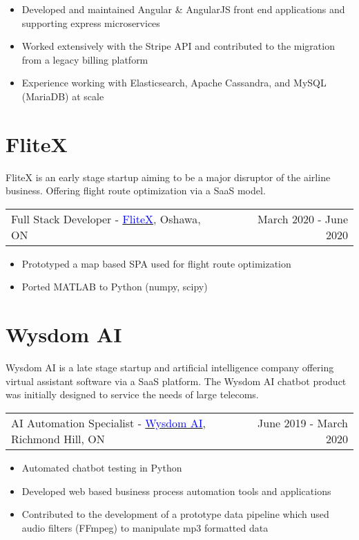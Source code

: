 \documentclass[margin]{res}
\begin{document}
\begin{resume}
	\begin{itemize} %
		\item Developed and maintained Angular \& AngularJS front end applications and supporting
		      express microservices
		\item Worked extensively with the Stripe API and contributed to the migration from a legacy
		      billing platform
		\item Experience working with Elasticsearch, Apache Cassandra, and MySQL (MariaDB) at scale
	\end{itemize}

	\normalsize{\section{FliteX}}

	FliteX is an early stage startup aiming to be a major disruptor of the airline business.
	Offering flight route optimization via a SaaS model.

	\begin{tabular}{p{3in} r} %
		Full Stack Developer - \href{https://flitex.net/}{\textcolor{blue}{FliteX}}, Oshawa, ON & March 2020 - June 2020
	\end{tabular}
	\begin{itemize} %
		\item Prototyped a map based SPA used for flight route optimization
		\item Ported MATLAB to Python (numpy, scipy)
	\end{itemize}

	\normalsize{\section{Wysdom AI}}

	Wysdom AI is a late stage startup and artificial intelligence company offering virtual assistant software
	via a SaaS platform. The Wysdom AI chatbot product was initially designed to service the needs of
	large telecoms.

	\begin{tabular}{p{3in} r} %
		AI Automation Specialist - \href{https://wysdom.ai}{\textcolor{blue}{Wysdom AI}}, Richmond Hill, ON & June 2019 - March 2020
	\end{tabular}
	\begin{itemize} %
		\item Automated chatbot testing in Python
		\item Developed web based business process automation tools and applications
		\item Contributed to the development of a prototype data pipeline which used audio filters
		      (FFmpeg) to manipulate mp3 formatted data


\end{itemize}
\end{resume}
\end{document}
